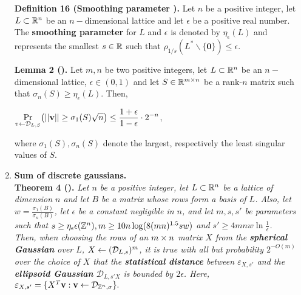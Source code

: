 \begin{enumerate}
	\textbf{Definition 16 (Smoothing parameter \cite{MiR04}).} Let $n$ be a positive integer,  let $L \subset \mathbb{R}^n$ be an $n-$dimensional lattice and let $\epsilon$ be a positive real number. The \textbf{smoothing parameter} for $L$ and $\epsilon$ is denoted by $\eta_\epsilon(L)$ and represents the smallest $s \in \mathbb{R}$ such that $\rho_{1/s}(L^* \backslash \{\textbf{0}\}) \leq \epsilon$.

	\textbf{Lemma 2 (\cite{AGH+12}).} Let $m,n$ be two positive integers,  let $L \subset \mathbb{R}^n$ be an $n-$dimensional lattice, $\epsilon \in (0,1)$ and let $S\in\mathbb{R}^{m\times n}$ be a rank-$n$ matrix such that $\sigma_n(S) \geq \eta_\epsilon(L)$. Then, 
	\begin{center}
		$\displaystyle{\Pr_{v \leftarrow\mathcal{D}_{L, S}}} \big( ||\textbf{v}|| \geq \sigma_1(S) \sqrt{n} \big)\leq \frac{1 + \epsilon}{1 - \epsilon} \cdot 2^{-n}$,
	\end{center}
where $\sigma_1(S), \sigma_n(S)$ denote the largest, respectively the least singular values of $S$.

\item \textbf{Sum of discrete gaussians.} \\
\textbf{Theorem 4 (\cite{GGH13}).} \textit{Let $n$ be a positive integer, let $L \subset \mathbb{R}^n$ be a lattice of dimension $n$ and let $B$ be a matrix whose rows form a basis of $L$. Also, let $w = \frac{\sigma_1(B)}{\sigma_n(B)}$, let $\epsilon$ be a constant negligible in $n$, and let $m, s, s'$ be parameters such that $s \geq \eta_\epsilon\epsilon({\mathbb Z}^n), m \geq 10n\log(8(mn)^{1.5}sw)$ and $s' \geq 4mnw \ln \frac{1}{\epsilon}$.\\
Then, when choosing the rows of an $m\times n$ matrix $X$ from the \textbf{spherical Gaussian} over $L$, $X \leftarrow (\mathcal{D}_{L, s})^m$, it is true with all but probability $2^{-O(m)}$ over the choice of $X$ that the \textbf{statistical distance} between $\varepsilon_{X, s'}$ and the \textbf{ellipsoid Gaussian} $\mathcal{D}_{L, s'X}$ is bounded by $2\epsilon$. Here,} $\varepsilon_{X,s'} = \{X^T \textbf{v} : \textbf{v} \leftarrow \mathcal{D}_{{\mathbb Z}^n, \sigma}\}.$

\end{enumerate}

